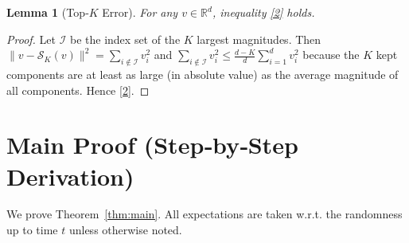 \documentclass{article}
\newtheorem{lemma}{Lemma}
\newcommand{\R}{\mathbb{R}}
\newcommand{\topk}{\mathcal{S}_K}
\begin{document}
\begin{lemma}[Top‑$K$ Error]\label{lem:topk}
For any $v\in\R^{d}$, inequality \eqref{2} holds.
\end{lemma}
\begin{proof}
Let $\mathcal{I}$ be the index set of the $K$ largest magnitudes.
Then $\|v-\topk(v)\|^{2}= \sum_{i\notin\mathcal{I}}v_{i}^{2}$
and $\sum_{i\notin\mathcal{I}}v_{i}^{2}\le\frac{d-K}{d}\sum_{i=1}^{d}v_{i}^{2}$ because the $K$ kept components are at least as large (in absolute value) as the average magnitude of all components. Hence \eqref{2}.
\end{proof}

\section*{Main Proof (Step‑by‑Step Derivation)}
We prove Theorem~\ref{thm:main}.  
All expectations are taken w.r.t. the randomness up to time $t$ unless otherwise noted.
\end{document}
